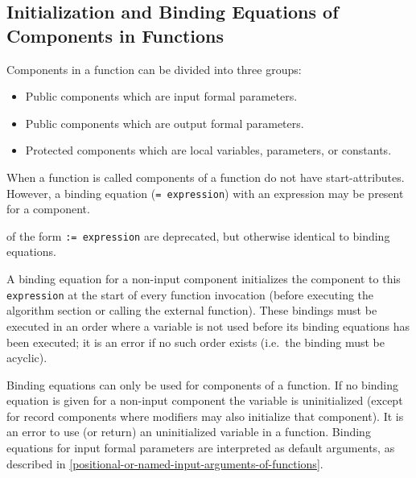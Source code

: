 \subsection{Initialization and Binding Equations of Components in Functions}
\label{initialization-and-binding-equations-of-components-in-functions}
\label{initialization-and-declaration-assignments-of-components-in-functions}

Components in a function can be divided into three groups:
\begin{itemize}
\item
  Public components which are input formal parameters.
\item
  Public components which are output formal parameters.
\item
  Protected components which are local variables, parameters, or
  constants.
\end{itemize}

When a function is called components of a function do not have start-attributes.
However, a binding equation (\lstinline!= expression!) with an expression may be present for a component.
\begin{nonnormative}
 of the form \lstinline!:= expression! are deprecated, but otherwise identical to binding equations.
\end{nonnormative}

A binding equation for a non-input component initializes the
component to this \lstinline!expression! at the start of every function invocation
(before executing the algorithm section or calling the external
function). These bindings must be executed in an order where a variable
is not used before its binding equations has been executed; it is
an error if no such order exists (i.e.\ the binding must be acyclic).

Binding equations can only be used for components of a function.
If no binding equation is given for a non-input component the variable is uninitialized (except for record components where modifiers may also initialize that component).
It is an error to use (or return) an uninitialized variable in a function.
Binding equations for input formal parameters are interpreted as default arguments, as described in
\cref{positional-or-named-input-arguments-of-functions}.

